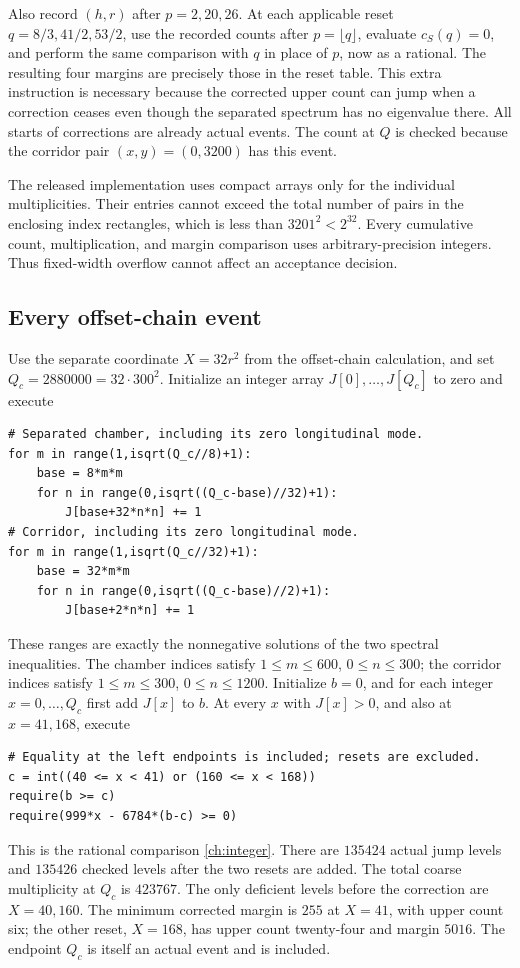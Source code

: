 \documentclass[11pt,reqno]{amsart}
\numberwithin{equation}{section}
\begin{document}
Also record $(h,r)$ after $p=2,20,26$. At each applicable reset
$q=8/3,41/2,53/2$, use the recorded counts after $p=\lfloor q\rfloor$,
evaluate $c_S(q)=0$, and perform the same comparison with $q$ in place
of $p$, now as a rational. The resulting four margins are precisely
those in the reset table. This extra instruction is necessary because
the corrected upper count can jump when a correction ceases even though
the separated spectrum has no eigenvalue there. All starts of corrections
are already actual events. The count at $Q$ is checked because the
corridor pair $(x,y)=(0,3200)$ has this event.

The released implementation uses compact arrays only for the individual
multiplicities. Their entries cannot exceed the total number of pairs in
the enclosing index rectangles, which is less than $3201^2<2^{32}$.
Every cumulative count, multiplication, and margin comparison uses
arbitrary-precision integers. Thus fixed-width overflow cannot affect an
acceptance decision.

\subsection{Every offset-chain event}

Use the separate coordinate $X=32r^2$ from the offset-chain calculation,
and set $Q_c=2880000=32\cdot300^2$. Initialize an integer array
$J[0],\ldots,J[Q_c]$ to zero and execute
\begin{verbatim}
# Separated chamber, including its zero longitudinal mode.
for m in range(1,isqrt(Q_c//8)+1):
    base = 8*m*m
    for n in range(0,isqrt((Q_c-base)//32)+1):
        J[base+32*n*n] += 1
# Corridor, including its zero longitudinal mode.
for m in range(1,isqrt(Q_c//32)+1):
    base = 32*m*m
    for n in range(0,isqrt((Q_c-base)//2)+1):
        J[base+2*n*n] += 1
\end{verbatim}
These ranges are exactly the nonnegative solutions of the two spectral
inequalities. The chamber indices satisfy $1\le m\le600$,
$0\le n\le300$; the corridor indices satisfy $1\le m\le300$,
$0\le n\le1200$. Initialize $b=0$, and for each integer
$x=0,\ldots,Q_c$ first add $J[x]$ to $b$. At every $x$ with $J[x]>0$,
and also at $x=41,168$, execute
\begin{verbatim}
# Equality at the left endpoints is included; resets are excluded.
c = int((40 <= x < 41) or (160 <= x < 168))
require(b >= c)
require(999*x - 6784*(b-c) >= 0)
\end{verbatim}
This is the rational comparison \eqref{ch:integer}. There are $135424$
actual jump levels and $135426$ checked levels after the two resets
are added. The total coarse multiplicity at $Q_c$ is $423767$.
The only deficient levels before the correction are $X=40,160$.
The minimum corrected margin is $255$ at $X=41$, with upper count six;
the other reset, $X=168$, has upper count twenty-four and margin $5016$.
The endpoint $Q_c$ is itself an actual event and is included.
\end{document}
